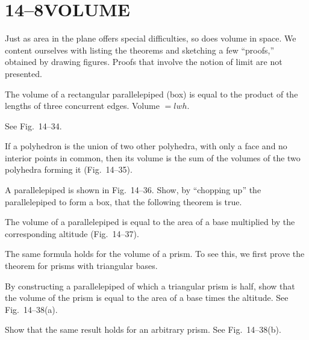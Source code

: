 \documentclass[11pt]{book}
\theoremstyle{bkplain}
\theoremstyle{XIplainnote}
\theoremstyle{bkplain}
\theoremstyle{bkplain}
\begin{document}
\section*{14--8\quad VOLUME}

Just as area in the plane offers special difficulties, so does volume in space.
We content ourselves with listing the theorems and sketching a few ``proofs,''
obtained by drawing figures. Proofs that involve the notion of limit are not
presented.

\begin{theorem}
The volume of a rectangular parallelepiped (box) is equal to the product of the
lengths of three concurrent edges. Volume $=lwh$.
\end{theorem}

\noindent See Fig.~14--34.

\FIGXIVTHIRTYFOURTHIRTYFIVE

\begin{theorem}
If a polyhedron is the union of two other polyhedra, with only a face and no
interior points in common, then its volume is the sum of the volumes of the two
polyhedra forming it (Fig.~14--35).
\end{theorem}

A parallelepiped is shown in Fig.~14--36. Show, by ``chopping up'' the
parallelepiped to form a box, that the following theorem is true.

\FIGXIVTHIRTYSIXTHIRTYSEVEN

\begin{theorem}
The volume of a parallelepiped is equal to the area of a base multiplied by the
corresponding altitude (Fig.~14--37).
\end{theorem}

The same formula holds for the volume of a prism. To see this, we first prove
the theorem for prisms with triangular bases.

\begin{exercisecols}
\begin{exlist}
\item By constructing a parallelepiped of which a triangular prism is half, show
      that the volume of the prism is equal to the area of a base times the
      altitude. See Fig.~14--38(a).
\exfig{\FIGXIVTHIRTYEIGHT}
\item Show that the same result holds for an arbitrary prism. See
      Fig.~14--38(b).
\end{exlist}
\end{exercisecols}
\end{document}

